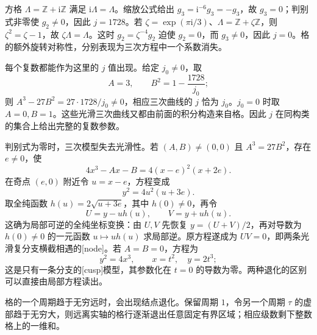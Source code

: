 \begin{example}\label{g4:exm:0405:symmetric-lattices}
	方格 \(\Lambda=\mathbb Z+\mathrm{i}\mathbb Z\) 满足 \(\mathrm{i}\Lambda=\Lambda\)。缩放公式给出
	\(g_3=\mathrm{i}^{-6}g_3=-g_3\)，故 \(g_3=0\)；判别式非零使 \(g_2\ne0\)，因此 \(j=1728\)。若
	\(\zeta=\exp(\pi\mathrm{i}/3)\)、\(\Lambda=\mathbb Z+\zeta\mathbb Z\)，则 \(\zeta^2=\zeta-1\)，故 \(\zeta\Lambda=\Lambda\)。这时 \(g_2=\zeta^{-4}g_2\) 迫使 \(g_2=0\)，而 \(g_3\ne0\)，因此 \(j=0\)。格的额外旋转对称性，分别表现为三次方程中一个系数消失。
\end{example}

每个复数都能作为这里的 \(j\) 值出现。给定 \(j_0\ne0\)，取
\[
	A=3,\qquad B^2=1-\frac{1728}{j_0};
\]
则 \(A^3-27B^2=27\cdot1728/j_0\ne0\)，相应三次曲线的 \(j\) 恰为 \(j_0\)。\(j_0=0\) 时取 \(A=0,B=1\)。这些光滑三次曲线又都由前面的积分构造来自格。因此 \(j\) 在同构类的集合上给出完整的复数参数。

\ProseParagraphBreak

判别式为零时，三次模型失去光滑性。若 \((A,B)\ne(0,0)\) 且 \(A^3=27B^2\)，存在 \(e\ne0\)，使
\[
	4x^3-Ax-B=4(x-e)^2(x+2e).
\]
在奇点 \((e,0)\) 附近令 \(u=x-e\)，方程变成
\[
	y^2=4u^2(u+3e).
\]
取全纯函数 \(h(u)=2\sqrt{u+3e}\)，其中 \(h(0)\ne0\)，再令
\[
	U=y-u h(u),\qquad V=y+u h(u).
\]
这确为局部可逆的全纯坐标变换：由 \(U,V\) 先恢复 \(y=(U+V)/2\)，再对导数为 \(h(0)\ne0\) 的一元函数 \(u\mapsto u h(u)\) 求局部逆。原方程遂成为 \(UV=0\)，即两条光滑复分支横截相遇的[node]。若 \(A=B=0\)，方程为
\[
	y^2=4x^3,\qquad x=t^2,\quad y=2t^3;
\]
这是只有一条分支的[cusp]模型，其参数化在 \(t=0\) 的导数为零。两种退化的区别可以直接由局部方程读出。

\ProseParagraphBreak

格的一个周期趋于无穷远时，会出现结点退化。保留周期 \(1\)，令另一个周期 \(\tau\) 的虚部趋于无穷大，则远离实轴的格行逐渐退出任意固定有界区域；相应级数剩下整数格上的一维和。


